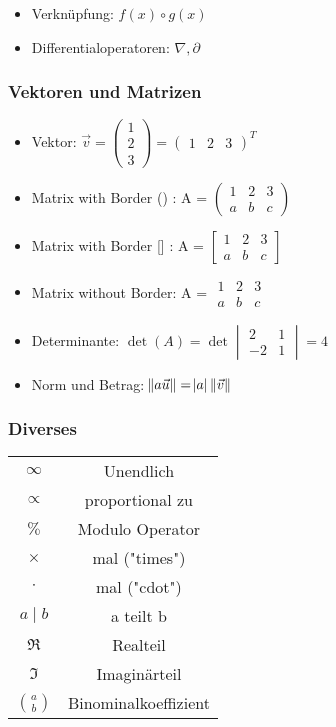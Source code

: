 \documentclass{scrartcl} %
\newcommand{\matp}[1]{ \displaystyle \begin{pmatrix} #1 \end{pmatrix} }
\newcommand{\matb}[1]{ \displaystyle \begin{bmatrix} #1 \end{bmatrix} }
\newcommand{\mat}[1]{ \displaystyle \begin{matrix} #1 \end{matrix}}
\begin{document}
\begin{multicols*}{3}
\begin{itemize}
					        \item Verknüpfung: $f(x) \circ g(x)$
					        \item Differentialoperatoren: $\nabla, \partial$
					    \end{itemize}
					\subsubsection{Vektoren und Matrizen}
					    \begin{itemize}
					        \item Vektor: $\vec{v} = \matp{1 \\ 2 \\ 3} = \matp{1 & 2 & 3}^T$
						    \item Matrix with Border () : A = $\matp{1 & 2 & 3 \\ a & b & c}$
						    \item Matrix with Border [] : A =  $\matb{1 & 2 & 3 \\ a & b & c}$
						    \item Matrix without Border: A = $\mat{1 & 2 & 3 \\ a & b & c}$
						    \item Determinante: $\det(A) = \det
    						    \begin{vmatrix}
    						        2 & 1 \\ 
    						        -2 & 1
    						    \end{vmatrix} = 4$
    						 \item Norm und Betrag: $\norm{a \vec{u}} = \abs{a} \, \norm{\vec{v}}$
					    \end{itemize}
					\subsubsection{Diverses}
					    \begin{tabular}[h]{|c|c|}
					         $\infty$ & Unendlich \\
					         $\propto$ & proportional zu \\
					         $\%$ & Modulo Operator \\
					         $\times$ & mal ("times") \\
					         $\cdot$ & mal ("cdot") \\
					         $a \mid b$ & a teilt b \\
					         $\Re$ & Realteil \\
					         $\Im$ & Imaginärteil \\
					         $\binom{a}{b}$ & Binominalkoeffizient \\
					    \end{tabular}
				    
	\end{multicols*}
\setcounter{secnumdepth}{2}
\end{document}
